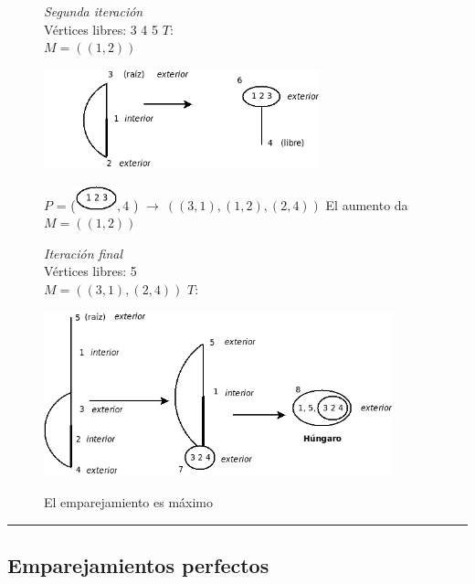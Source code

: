 \documentclass[10pt,a5paper]{book}
\begin{document}
\begin{figure}[H]
\hspace*{-.5in}\parbox{5cm}
{
\emph{Segunda iteración}\\
Vértices libres: 3 4 5 \quad $T:$\\
$M = ((1,2))$ \\
}
\parbox{2cm}
{
\hspace*{-1.95in}\includegraphics[width=8cm]{Fig4_6_3.png}\\
}
\vspace*{.1in}
\parbox{12cm}
{
$P$ = \bigg(\includegraphics[width=1.2cm]{Fig4_6_4.png}$, 4$ \bigg) $\rightarrow\ ((3,1),(1,2),(2,4))$ El aumento da $M = ((1,2))$
}
\vspace*{.2in}
\hspace*{-.9in}\parbox{5cm}
{
\emph{Iteración final}\\
Vértices libres: 5\\
$M = ((3,1),(2,4))$ \quad $T$:\\
}
\parbox{2cm}
{
\hspace*{-.6in}  \includegraphics[width=10.1cm]{Fig4_6_5.png}\\
}
\begin{center} El emparejamiento es máximo \end{center}
\end{figure}
\hrule{}
\subsection{Emparejamientos perfectos}
\end{document}
